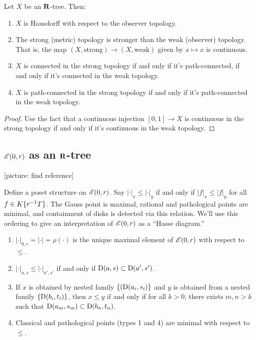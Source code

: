 \begin{lemma}
Let $X$ be an $\mathbf{R}$-tree. Then:
\begin{enumerate}
\item $X$ is Hausdorff with respect to the observer topology. 

\item
The strong (metric) topology is stronger than the weak (observer) topology. 
That is, the map $(X,\text{strong}) \to (X,\text{weak})$ given by $x\mapsto x$ 
is continuous. 

\item
$X$ is connected in the strong topology if and only if it's path-connected, if 
and only if it's connected in the weak topology.

\item
$X$ is path-connected in the strong topology if and only if it's path-connected 
in the weak topology. 
\end{enumerate}
\end{lemma}
\begin{proof}
Use the fact that a continuous injection $[0,1]\to X$ is continuous in the 
strong topology if and only if it's continuous in the weak topology. 
\end{proof}





\subsection{\texorpdfstring{$\mathscr{E}(0,r)$}{E(0,r)} as an \texorpdfstring{$\mathbf{R}$}{R}-tree}

[picture: find reference]

Define a poset structure on $\mathscr{E}(0,r)$. Say $|\cdot|_x\leqslant |\cdot|_y$ if 
and only if $|f|_x \leqslant |f|_y$ for all $f\in K\{ r^{-1} T \}$. The Gauss 
point is maximal, rational and pathological points are minimal, and containment 
of disks is detected via this relation. We'll use this ordering to give an 
interpretation of $\mathscr{E}(0,r)$ as a ``Hasse diagram.'' 

\begin{lemma}
\leavevmode
\begin{enumerate}
\item
$|\cdot|_{0,r} = |\cdot| = \rho(\cdot)$ is the unique maximal element of 
$\mathscr{E}(0,r)$ with respect to $\leqslant $. 

\item
$|\cdot|_{a,s} \leqslant |\cdot|_{a',s'}$ if and only if 
$\operatorname{D}(a,s)\subset \operatorname{D}(a',s')$. 

\item
If $x$ is obtained by nested family $\{(\operatorname{D}(a_i,s_i)\}$ and $y$ is obtained 
from a nested family $\{\operatorname{D}(b_i,t_i)\}$, then $x\leqslant y$ if and only if 
for all $k>0$, there exists $m,n>k$ such that 
$\operatorname{D}(a_m,s_m)\subset \operatorname{D}(b_n,t_n)$. 

\item
Classical and pathological points (types 1 and 4) are minimal with respect to 
$\leqslant$. 
\end{enumerate}
\end{lemma}

